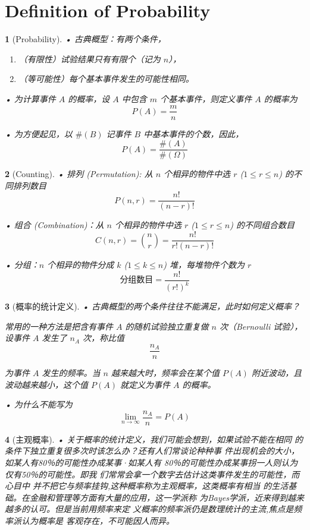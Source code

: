 \documentclass[UTF8]{report}
\theoremstyle{MyLineTheoremStyle} %
\theoremstyle{MyBlockTheoremStyle} %
\theoremstyle{MySubsubsectionStyle} %
\newtheorem{definition}{}
\begin{document}
\section{Definition of Probability}
\begin{definition}[Probability]
    • 古典概型：有两个条件，
    \begin{enumerate}
        \item （有限性）试验结果只有有限个（记为 \( n \)），
        \item （等可能性）每个基本事件发生的可能性相同。
    \end{enumerate}
    \par• 为计算事件 \( A \) 的概率，设 \( A \) 中包含 \( m \) 个基本事件，则定义事件 \( A \) 的概率为
    \[
    P(A) = \frac{m}{n}
    \]\par
    • 为方便起见，以 \(\#(B)\) 记事件 \( B \) 中基本事件的个数，因此，
    \[
    P(A) = \frac{\#(A)}{\#(\Omega)}
    \]
\end{definition}

\begin{definition}[Counting]
    • 排列 (Permutation): 从 \( n \) 个相异的物件中选 \( r \) (\(1 \leq r \leq n\)) 的不同排列数目
    \[
    P(n, r) = \frac{n!}{(n-r)!}
    \]\par
    • 组合 (Combination)：从 \( n \) 个相异的物件中选 \( r \) (\(1 \leq r \leq n\)) 的不同组合数目
    \[
    C(n, r) = \binom{n}{r} = \frac{n!}{r!(n-r)!}
    \]\par
    • 分组：\( n \) 个相异的物件分成 \( k \) (\(1 \leq k \leq n\)) 堆，每堆物件个数为 \( r \)
    \[
    \text{分组数目} = \frac{n!}{(r!)^k}
    \]
\end{definition}

\begin{definition}[概率的统计定义]
    • 古典概型的两个条件往往不能满足，此时如何定义概率？\par
    常用的一种方法是把含有事件 \( A \) 的随机试验独立重复做 \( n \) 次（Bernoulli 试验），设事件 \( A \) 发生了 \( n_A \) 次，称比值
    \[
    \frac{n_A}{n}
    \]\par
    为事件 \( A \) 发生的频率。当 \( n \) 越来越大时，频率会在某个值 \( P(A) \) 附近波动，且波动越来越小，这个值 \( P(A) \) 就定义为事件 \( A \) 的概率。\par
    • 为什么不能写为 \[
        \lim_{n \to \infty} \frac{n_A}{n} = P(A)
        \]
\end{definition}

\begin{definition}[主观概率]
    • 关于概率的统计定义，我们可能会想到，如果试验不能在相同
的条件下独立重复很多次时该怎么办？还有人们常谈论种种事
件出现机会的大小，如某人有80％的可能性办成某事·如某人有
80％的可能性办成某事拐一人则认为仅有50％的可能性。即我
们常常会拿一个数字去估计这类事件发生的可能性，而心目中
并不把它与频率挂钩,这种概率称为主观概率，这类概率有相当
的生活基础。在金融和管理等方面有大量的应用，这一学派称
为Bayes学派，近来得到越来越多的认可。但是当前用频率来定
义概率的频率派仍是数理统计的主流,焦点是频率派认为概率是
客观存在，不可能因人而异。
\end{definition}
\end{document}
